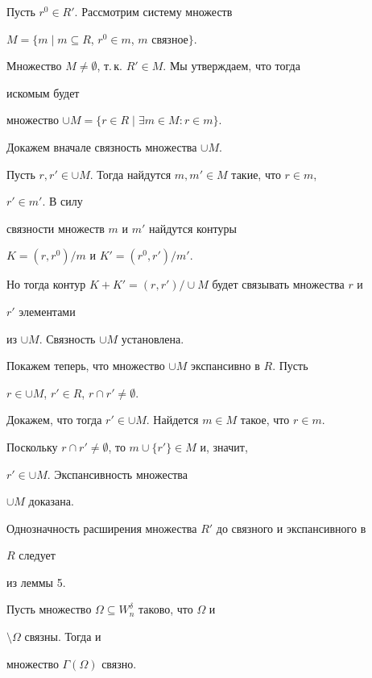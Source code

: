 \begin{pf} 


Пусть $r^0\in R'$. Рассмотрим систему множеств 


$M=\{m\mid m\subseteq R$, $r^0\in m$, $m$ связное$\}$. 


Множество $M\ne\emptyset$, т.\,к. $R'\in M$. Мы утверждаем, что тогда 


искомым будет 


множество $\cup M=\{r\in R\mid\exists m\in M:r\in m\}$. 


 


Докажем вначале связность множества $\cup M$. 


Пусть $r,r'\in\cup M$. Тогда найдутся $m,m'\in M$ такие, что $r\in m$, 


$r'\in m'$. В силу 


связности множеств $m$ и $m'$ найдутся контуры 


$K=(r,r^0)/m$ и $K'=(r^0,r')/m'$. 


Но тогда контур $K+K'=(r,r')/\cup M$ будет связывать множества $r$ и 


$r'$ элементами 


из $\cup M$. Связность $\cup M$ установлена. 


 


Покажем теперь, что множество $\cup M$ экспансивно в $R$. Пусть 


$r\in\cup M$, $r'\in R$, $r\cap r'\ne\emptyset$. 


Докажем, что тогда $r'\in\cup M$. Найдется $m\in M$ такое, что $r\in 


m$. 


Поскольку $r\cap r'\ne\emptyset$, то $m\cup\{r'\}\in M$ и, значит, 


$r'\in\cup M$. Экспансивность множества 


$\cup M$ доказана. 


Однозначность расширения множества $R'$ до связного и экспансивного в 


$R$ следует 


из леммы 5. 


\end{pf} 


 


\begin{thm} 


Пусть множество $\Omega\subseteq W^\delta_n$ таково, что $\Omega$ и 


$\setminus\Omega$ связны. Тогда и 


множество $\Gamma(\Omega)$ связно. 


\end{thm} 


